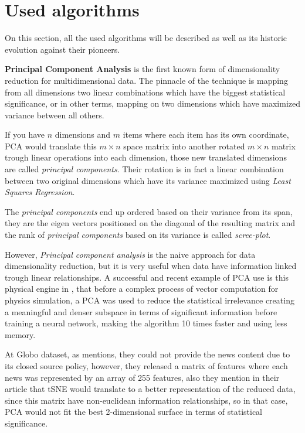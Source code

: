 \documentclass[ecp,tc,english]{iiufrgs}
\begin{document}
    \newpage

    \section{Used algorithms} \label{algorithms}
    
    On this section, all the used algorithms will be described as well as its historic evolution against their pioneers.
        
    \textbf{Principal Component Analysis} \cite{hotelling1933}  is the first known form of dimensionality reduction for multidimensional data. The pinnacle of the technique is mapping from all dimensions two linear combinations which have the biggest statistical significance, or in other terms, mapping on two dimensions which have maximized variance between all others.
    
    If you have \(n\) dimensions and \(m\) items where each item has its own coordinate, PCA would translate this \(m \times n\) space matrix into another rotated \(m \times n\) matrix trough linear operations into each dimension, those new translated dimensions are called \textit{principal components}.
    Their rotation is in fact a linear combination between two original dimensions which have its variance maximized using \textit{Least Squares Regression}.
    
    The \textit{principal components} end up ordered based on their variance from its span, they are the eigen vectors positioned on the diagonal of the resulting matrix and the rank of \textit{principal components} based on its variance is called \textit{scree-plot}.

    However, \textit{Principal component analysis} is the naive approach for data dimensionality reduction, but it is very useful when data have information linked trough linear relationships.
    A successful and recent example of PCA use is this physical engine in \cite{holden2019}, that before a complex process of vector computation for physics simulation, a PCA was used to reduce the statistical irrelevance creating a meaningful and denser subspace in terms of significant information before training a neural network, making the algorithm 10 times faster and using less memory.
    
    At Globo dataset, as \cite{moreira2018} mentions, they could not provide the news content due to its closed source policy, however, they released a matrix of features where each news was represented by an array of 255 features, also they mention in their article that tSNE would translate to a better representation of the reduced data, since this matrix have non-euclidean information relationships, so in that case, PCA would not fit the best 2-dimensional surface in terms of statistical significance.
    
\end{document}
